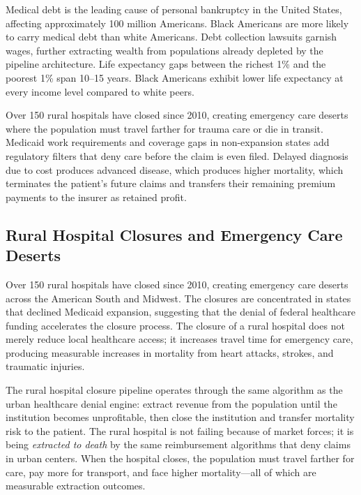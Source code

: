 Medical debt is the leading cause of personal bankruptcy in the United States, affecting approximately 100 million Americans. Black Americans are more likely to carry medical debt than white Americans. Debt collection lawsuits garnish wages, further extracting wealth from populations already depleted by the pipeline architecture. Life expectancy gaps between the richest 1\% and the poorest 1\% span 10--15 years. Black Americans exhibit lower life expectancy at every income level compared to white peers.

Over 150 rural hospitals have closed since 2010, creating emergency care deserts where the population must travel farther for trauma care or die in transit. Medicaid work requirements and coverage gaps in non-expansion states add regulatory filters that deny care before the claim is even filed. Delayed diagnosis due to cost produces advanced disease, which produces higher mortality, which terminates the patient's future claims and transfers their remaining premium payments to the insurer as retained profit.

\subsection{Rural Hospital Closures and Emergency Care Deserts}

Over 150 rural hospitals have closed since 2010, creating emergency care deserts across the American South and Midwest. The closures are concentrated in states that declined Medicaid expansion, suggesting that the denial of federal healthcare funding accelerates the closure process. The closure of a rural hospital does not merely reduce local healthcare access; it increases travel time for emergency care, producing measurable increases in mortality from heart attacks, strokes, and traumatic injuries.

The rural hospital closure pipeline operates through the same algorithm as the urban healthcare denial engine: extract revenue from the population until the institution becomes unprofitable, then close the institution and transfer mortality risk to the patient. The rural hospital is not failing because of market forces; it is being \textit{extracted to death} by the same reimbursement algorithms that deny claims in urban centers. When the hospital closes, the population must travel farther for care, pay more for transport, and face higher mortality---all of which are measurable extraction outcomes.

